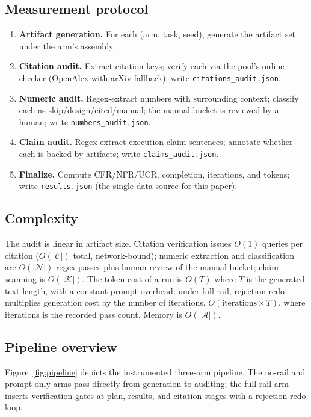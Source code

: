 \documentclass[10pt,twocolumn]{article}
\begin{document}
\subsection{Measurement protocol}
\begin{enumerate}[leftmargin=*]
\item \textbf{Artifact generation.} For each (arm, task, seed), generate the artifact set under the arm's assembly.
\item \textbf{Citation audit.} Extract citation keys; verify each via the pool's online checker (OpenAlex with arXiv fallback); write \texttt{citations\_audit.json}.
\item \textbf{Numeric audit.} Regex-extract numbers with surrounding context; classify each as skip/design/cited/manual; the manual bucket is reviewed by a human; write \texttt{numbers\_audit.json}.
\item \textbf{Claim audit.} Regex-extract execution-claim sentences; annotate whether each is backed by artifacts; write \texttt{claims\_audit.json}.
\item \textbf{Finalize.} Compute CFR/NFR/UCR, completion, iterations, and tokens; write \texttt{results.json} (the single data source for this paper).
\end{enumerate}

\subsection{Complexity}
The audit is linear in artifact size. Citation verification issues $O(1)$ queries per citation ($O(|\mathcal{C}|)$ total, network-bound); numeric extraction and classification are $O(|\mathcal{N}|)$ regex passes plus human review of the manual bucket; claim scanning is $O(|\mathcal{K}|)$. The token cost of a run is $O(T)$ where $T$ is the generated text length, with a constant prompt overhead; under full-rail, rejection-redo multiplies generation cost by the number of iterations, $O(\mathrm{iterations} \times T)$, where iterations is the recorded pass count. Memory is $O(|\mathcal{A}|)$.

\subsection{Pipeline overview}
Figure~\ref{fig:pipeline} depicts the instrumented three-arm pipeline. The no-rail and prompt-only arms pass directly from generation to auditing; the full-rail arm inserts verification gates at plan, results, and citation stages with a rejection-redo loop.
\end{document}
